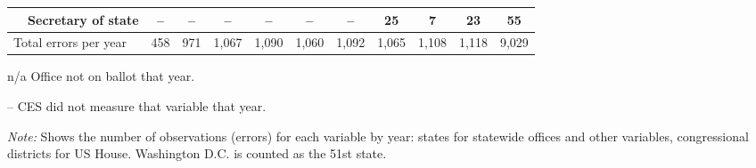 \begin{table}[!htbp]
{\begin{threeparttable}
\begin{tabular}{lcccccccccc}
~~Secretary of state & -- & -- & -- & -- & -- & -- & 25 & 7 & 23 & 55 \\
\midrule
Total errors per year & 458 & 971 & 1,067 & 1,090 & 1,060 & 1,092 & 1,065 & 1,108 & 1,118 & 9,029 \\
\bottomrule
\end{tabular}
\begin{tablenotes}
\footnotesize
\item n/a Office not on ballot that year.
\item -- CES did not measure that variable that year.
\item \textit{Note:} Shows the number of observations (errors) for each variable by year: states for statewide offices and other variables, congressional districts for US House. Washington D.C. is counted as the 51st state.
\end{tablenotes}
\end{threeparttable}%
}
\end{table}